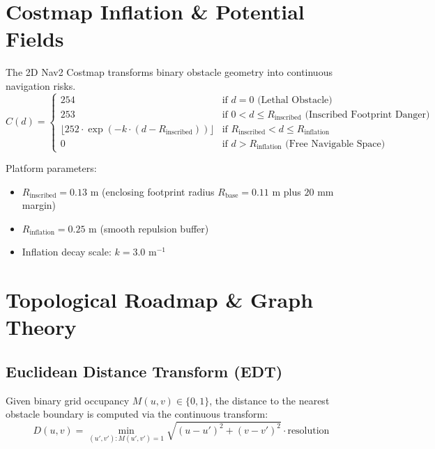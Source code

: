 \documentclass[10pt,a4paper]{article}
\begin{document}
\section{Costmap Inflation \& Potential Fields}

The 2D Nav2 Costmap transforms binary obstacle geometry into continuous navigation risks.
\begin{equation}
C(d) = \begin{cases} 
254 & \text{if } d = 0 \text{ (Lethal Obstacle)} \\
253 & \text{if } 0 < d \le R_{\text{inscribed}} \text{ (Inscribed Footprint Danger)} \\
\lfloor 252 \cdot \exp(-k \cdot (d - R_{\text{inscribed}})) \rfloor & \text{if } R_{\text{inscribed}} < d \le R_{\text{inflation}} \\
0 & \text{if } d > R_{\text{inflation}} \text{ (Free Navigable Space)}
\end{cases}
\end{equation}

Platform parameters:
\begin{itemize}
    \item $R_{\text{inscribed}} = 0.13\text{ m}$ (enclosing footprint radius $R_{\text{base}} = 0.11\text{ m}$ plus $20\text{ mm}$ margin)
    \item $R_{\text{inflation}} = 0.25\text{ m}$ (smooth repulsion buffer)
    \item Inflation decay scale: $k = 3.0\text{ m}^{-1}$
\end{itemize}

\section{Topological Roadmap \& Graph Theory}

\subsection{Euclidean Distance Transform (EDT)}
Given binary grid occupancy $M(u,v) \in \{0, 1\}$, the distance to the nearest obstacle boundary is computed via the continuous transform:
\begin{equation}
D(u, v) = \min_{(u', v'): M(u', v') = 1} \sqrt{(u - u')^2 + (v - v')^2} \cdot \text{resolution}
\end{equation}
\end{document}
